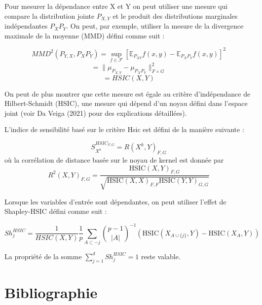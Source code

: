 \documentclass[
]{article}
\begin{document}
Pour mesurer la dépendance entre X et Y on peut utiliser une mesure qui
compare la distribution jointe \(P_{X,Y}\) et le produit des
distributions marginales indépendantes \(P_XP_Y\). On peut, par exemple,
utiliser la mesure de la divergence maximale de la moyenne (MMD) défini
comme suit :

\[MMD^2(P_{Y,X},P_XP_Y)=\sup_{f \in \mathcal{F}} \left[ \mathbb{E}_{P_{XY}} f (x, y) - \mathbb{E}_{P_X P_Y} f (x, y) \right]^2 \]
\[=\lVert\mu_{P_{X,Y}} - \mu_{P_X P_Y}\rVert^2_{F\times G}\]
\[=HSIC(X,Y)\]

On peut de plus montrer que cette mesure est égale au critère
d'indépendance de Hilbert-Schmidt (HSIC), une mesure qui dépend d'un
noyau défini dans l'espace joint (voir Da Veiga (2021) pour des
explications détaillées).

L'indice de sensibilité basé sur le critère Hsic est défini de la
manière suivante :

\[ S^{HSIC_{F,G}}_{X^k} = R(X^k, Y)_{F,G}  \] où la corrélation de
distance basée sur le noyau de kernel est donnée par
\[ R^2(X, Y)_{F,G} = \frac{\text{HSIC}(X, Y)_{F,G}}{\sqrt{\text{HSIC}(X, X)_{F,F} \text{HSIC}(Y, Y)_{G,G}}} \]

Lorsque les variables d'entrée sont dépendantes, on peut utiliser
l'effet de Shapley-HSIC défini comme suit :

\[ Sh^{HSIC}_j =\frac{1}{HSIC(X,Y)} \frac{1}{p} \sum_{A \subset -j} {{p-1 \choose |A|}}^{-1} ( \text{HSIC}(X_{A \cup \{j\}}, Y) - \text{HSIC}(X_A, Y) ) \]

La propriété de la somme \(\sum_{j=1}^{d} Sh^{HSIC}_j = 1\) reste
valable.

\hypertarget{bibliographie}{%
\section*{Bibliographie}\label{bibliographie}}
\end{document}
